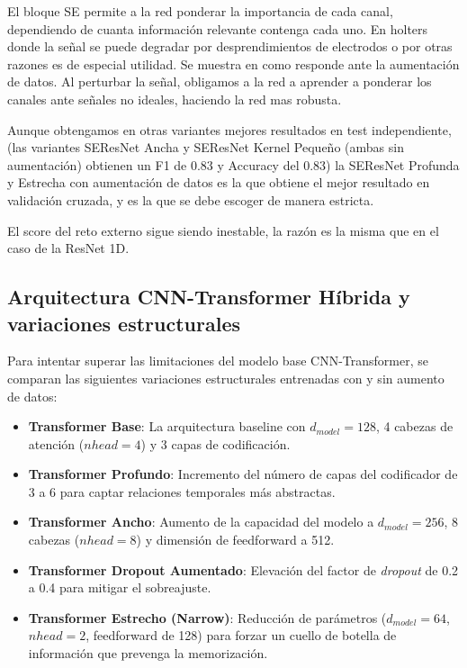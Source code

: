El bloque SE permite a la red ponderar la importancia de cada canal, dependiendo de cuanta información relevante contenga cada uno.
En holters donde la señal se puede degradar por desprendimientos de electrodos o por otras razones es de especial utilidad. Se muestra
en como responde ante la aumentación de datos. Al perturbar la señal, obligamos a la red a aprender a ponderar los canales ante señales
no ideales, haciendo la red mas robusta.

Aunque obtengamos en otras variantes mejores resultados en test independiente, (las variantes SEResNet Ancha y SEResNet Kernel
Pequeño (ambas sin aumentación) obtienen un F1 de 0.83 y Accuracy del 0.83)
la SEResNet Profunda y Estrecha con aumentación de datos es la que obtiene el mejor resultado
en validación cruzada, y es la que se debe escoger de manera estricta.

El score del reto externo sigue siendo inestable, la razón es la misma que en el caso de la ResNet 1D.

\subsection{Arquitectura CNN-Transformer Híbrida y variaciones estructurales}
\label{subsec:resultados_transformer}

Para intentar superar las limitaciones del modelo base CNN-Transformer,
se comparan las siguientes variaciones estructurales entrenadas
con y sin aumento de datos:
\begin{itemize}
    \item \textbf{Transformer Base}: La arquitectura baseline con $d_{model}=128$, 4 cabezas de atención ($nhead=4$) y 3 capas de codificación.
    \item \textbf{Transformer Profundo}: Incremento del número de capas del codificador de 3 a 6 para captar relaciones temporales más abstractas.
    \item \textbf{Transformer Ancho}: Aumento de la capacidad del modelo a $d_{model}=256$, 8 cabezas ($nhead=8$) y dimensión de feedforward a 512.
    \item \textbf{Transformer Dropout Aumentado}: Elevación del factor de \textit{dropout} de 0.2 a 0.4 para mitigar el sobreajuste.
    \item \textbf{Transformer Estrecho (Narrow)}: Reducción de parámetros ($d_{model}=64$, $nhead=2$, feedforward de 128) para forzar un cuello de botella de información que prevenga la memorización.
\end{itemize}

